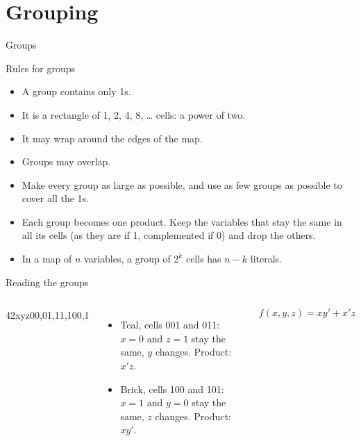 \documentclass[10pt]{wosm-slides}
\newenvironment{kmapthree}
  {\begin{kmap}{4}{2}{xy}{z}{00,01,11,10}{0,1}}
  {\end{kmap}}
\newcommand*\threeindices{%
  \kindices{0}{0,1}\kindices{1}{2,3}\kindices{2}{6,7}\kindices{3}{4,5}}
\begin{document}
\section{Grouping}

\begin{frame}{Groups}
  \begin{block}{Rules for groups}
    \begin{itemize}
      \item A group contains only 1s.
      \item It is a rectangle of 1, 2, 4, 8, \dots{} cells: a power of two.
      \item It may wrap around the edges of the map.
      \item Groups may overlap.
    \end{itemize}
  \end{block}

  \begin{itemize}
    \item Make every group \alert{as large as possible}, and use \alert{as few
      groups as possible} to cover all the 1s.
    \item Each group becomes one product. Keep the variables that stay the same in
      all its cells (as they are if 1, complemented if 0) and drop the others.
    \item In a map of $n$ variables, a group of $2^k$ cells has $n - k$ literals.
  \end{itemize}
\end{frame}

\begin{frame}{Reading the groups}
  \begin{columns}[c, totalwidth=\textwidth]
      \centering
      \begin{kmapthree}
        \threeindices
      \end{kmapthree}
      \begin{itemize}
        \item \textcolor{wosm-accent}{Teal}, cells 001 and 011: $x = 0$ and $z = 1$
          stay the same, $y$ changes. Product: $x'z$.
        \item \textcolor{group2}{Brick}, cells 100 and 101: $x = 1$ and $y = 0$ stay
          the same, $z$ changes. Product: $xy'$.
      \end{itemize}

      \medskip
      \[ f(x, y, z) = xy' + x'z \]
  \end{columns}
\end{frame}
\end{document}
